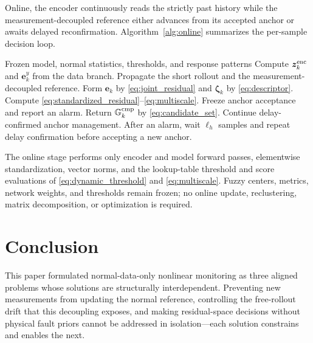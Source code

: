 \documentclass[journal]{IEEEtran}
\newcommand{\1}{\bm 1}
\begin{document}
Online, the encoder continuously reads the strictly past history while the
measurement-decoupled reference either advances from its accepted anchor or
awaits delayed reconfirmation. Algorithm~\ref{alg:online} summarizes the
per-sample decision loop.

\begin{algorithm}[H]
\caption{Online Monitoring}
\label{alg:online}
\begin{algorithmic}[1]
\Require Frozen model, normal statistics, thresholds, and response patterns
\State Compute $\bm z_k^{\rm enc}$ and $\bm e_k^y$ from the data branch.
\State Propagate the short rollout and the measurement-decoupled reference.
\State Form $\bm e_k$ by \eqref{eq:joint_residual} and
$\bm\zeta_k$ by \eqref{eq:descriptor}.
\State Compute \eqref{eq:standardized_residual}--\eqref{eq:multiscale}.
\State Freeze anchor acceptance and report an alarm.
\State Return $\mathbb G_k^{\rm cmp}$ by \eqref{eq:candidate_set}.
\Else
\State Continue delay-confirmed anchor management.
\EndIf
\State After an alarm, wait $\ell_h$ samples and repeat delay confirmation
before accepting a new anchor.
\EndFor
\end{algorithmic}
\end{algorithm}

The online stage performs only encoder and model forward passes, elementwise
standardization, vector norms, and the lookup-table threshold and score
evaluations of \eqref{eq:dynamic_threshold} and \eqref{eq:multiscale}. Fuzzy
centers, metrics, network weights, and thresholds remain frozen; no online
update, reclustering, matrix decomposition, or optimization is required.

\section{Conclusion}
This paper formulated normal-data-only nonlinear monitoring as three aligned
problems whose solutions are structurally interdependent. Preventing new
measurements from updating the normal reference, controlling the free-rollout
drift that this decoupling exposes, and making residual-space decisions without
physical fault priors cannot be addressed in isolation---each solution constrains
and enables the next.
\end{document}
